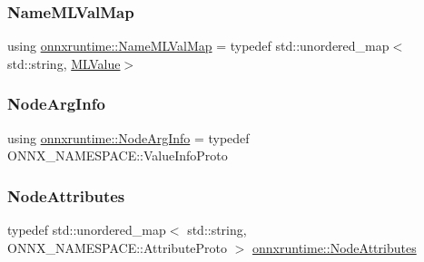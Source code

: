 \mbox{\label{namespaceonnxruntime_a48b01f0410ec8d693dbd40d1132bd66c}} 
\subsubsection{\texorpdfstring{Name\+M\+L\+Val\+Map}{NameMLValMap}}
{\footnotesize\ttfamily using \mbox{\hyperlink{namespaceonnxruntime_a48b01f0410ec8d693dbd40d1132bd66c}{onnxruntime\+::\+Name\+M\+L\+Val\+Map}} = typedef std\+::unordered\+\_\+map$<$std\+::string, \mbox{\hyperlink{classonnxruntime_1_1MLValue}{M\+L\+Value}}$>$}

\mbox{\label{namespaceonnxruntime_a86887111d4a0c110d744c19de4333c04}} 
\subsubsection{\texorpdfstring{Node\+Arg\+Info}{NodeArgInfo}}
{\footnotesize\ttfamily using \mbox{\hyperlink{namespaceonnxruntime_a86887111d4a0c110d744c19de4333c04}{onnxruntime\+::\+Node\+Arg\+Info}} = typedef O\+N\+N\+X\+\_\+\+N\+A\+M\+E\+S\+P\+A\+C\+E\+::\+Value\+Info\+Proto}

\mbox{\label{namespaceonnxruntime_a7fa616c461850e300cfa552afd46eed4}} 
\subsubsection{\texorpdfstring{Node\+Attributes}{NodeAttributes}}
{\footnotesize\ttfamily typedef std\+::unordered\+\_\+map$<$ std\+::string, O\+N\+N\+X\+\_\+\+N\+A\+M\+E\+S\+P\+A\+C\+E\+::\+Attribute\+Proto $>$ \mbox{\hyperlink{namespaceonnxruntime_a7fa616c461850e300cfa552afd46eed4}{onnxruntime\+::\+Node\+Attributes}}}

\mbox{\label{namespaceonnxruntime_af8773b5c12b5d8fd9292eb2e268df760}} 
